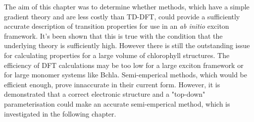 The aim of this chapter was to determine whether \dscf methods, which have a simple
gradient theory and are less costly than TD-DFT, could provide a sufficiently accurate
description of transition properties for use in an \emph{ab initio} exciton framework.
It's been shown that this is true with the condition that the underlying theory
is sufficiently high. However there is still the outstanding issue for calculating
properties for a large volume of  chlorophyll structures. The efficiency of DFT calculations 
may be too low for a large exciton framework or for large monomer systems like Bchla.
Semi-emperical \dscf methods, which would be efficient enough, prove innaccurate 
in their current form. However, it is demonstrated that a correct electronic structure
and a "top-down" parameterisation could make an accurate semi-emperical method, 
which is investigated in the following chapter.

